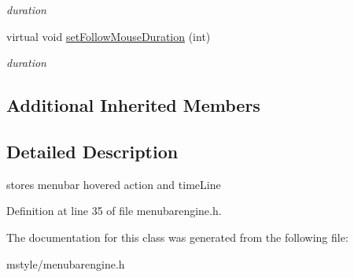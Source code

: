 \begin{DoxyCompactItemize}
\begin{DoxyCompactList}\small\item\em duration \end{DoxyCompactList}\item 
\mbox{\label{class_menu_bar_base_engine_a4b3955e7d885f39638c23e76d1a02862}} 
virtual void \hyperlink{class_menu_bar_base_engine_a4b3955e7d885f39638c23e76d1a02862}{set\+Follow\+Mouse\+Duration} (int)
\begin{DoxyCompactList}\small\item\em duration \end{DoxyCompactList}\end{DoxyCompactItemize}
\subsection*{Additional Inherited Members}


\subsection{Detailed Description}
stores menubar hovered action and time\+Line 

Definition at line 35 of file menubarengine.\+h.



The documentation for this class was generated from the following file\+:\begin{DoxyCompactItemize}
\item 
mstyle/menubarengine.\+h\end{DoxyCompactItemize}
